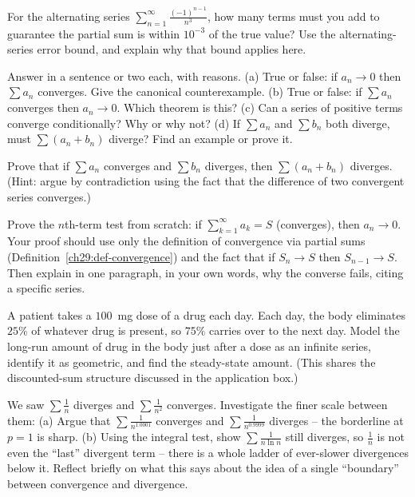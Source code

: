 \begin{exercise}
For the alternating series $\displaystyle\sum_{n=1}^\infty \frac{(-1)^{n-1}}{n^3}$, how many terms must you add to guarantee the partial sum is within $10^{-3}$ of the true value? Use the alternating-series error bound, and explain why that bound applies here.
\end{exercise}

\begin{exercise}[Conceptual]
Answer in a sentence or two each, with reasons.
(a) True or false: if $a_n \to 0$ then $\sum a_n$ converges. Give the canonical counterexample.
(b) True or false: if $\sum a_n$ converges then $a_n \to 0$. Which theorem is this?
(c) Can a series of positive terms converge conditionally? Why or why not?
(d) If $\sum a_n$ and $\sum b_n$ both diverge, must $\sum(a_n+b_n)$ diverge? Find an example or prove it.
\end{exercise}

\begin{exercise}[Prove it]
Prove that if $\sum a_n$ converges and $\sum b_n$ diverges, then $\sum (a_n + b_n)$ diverges. (Hint: argue by contradiction using the fact that the difference of two convergent series converges.)
\end{exercise}

\begin{exercise}
Prove the $n$th-term test from scratch: if $\sum_{k=1}^\infty a_k = S$ (converges), then $a_n \to 0$. Your proof should use only the definition of convergence via partial sums (Definition~\ref{ch29:def-convergence}) and the fact that if $S_n \to S$ then $S_{n-1}\to S$. Then explain in one paragraph, in your own words, why the converse fails, citing a specific series.
\end{exercise}

\begin{exercise}
A patient takes a $100$~mg dose of a drug each day. Each day, the body eliminates $25\%$ of whatever drug is present, so $75\%$ carries over to the next day. Model the long-run amount of drug in the body just after a dose as an infinite series, identify it as geometric, and find the steady-state amount. (This shares the discounted-sum structure discussed in the application box.)
\end{exercise}

\begin{exercise}
We saw $\sum \tfrac1n$ diverges and $\sum\tfrac1{n^2}$ converges. Investigate the finer scale between them:
(a) Argue that $\sum \tfrac{1}{n^{1.0001}}$ converges and $\sum\tfrac{1}{n^{0.9999}}$ diverges -- the borderline at $p=1$ is sharp.
(b) Using the integral test, show $\sum \tfrac{1}{n\ln n}$ still diverges, so $\tfrac1n$ is not even the ``last'' divergent term -- there is a whole ladder of ever-slower divergences below it. Reflect briefly on what this says about the idea of a single ``boundary'' between convergence and divergence.
\end{exercise}
